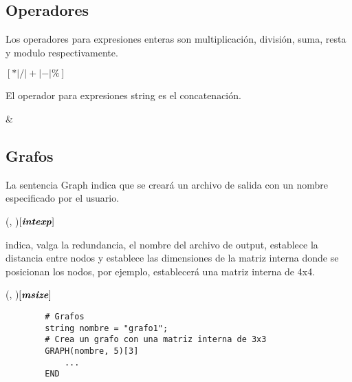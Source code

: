 \documentclass{article}
\begin{document}
    \subsection{Operadores}
    Los operadores para expresiones enteras son multiplicación, división, suma, resta y modulo respectivamente.
    \begin{center}
         $\left[*|/|+|-|\%\right]$ 
    \end{center}
    El operador para expresiones string es el concatenación.
    \begin{center}
         \& 
    \end{center}

    \subsection{Grafos}
    La sentencia Graph indica que se creará un archivo de salida con un nombre especificado por el usuario. 
    \begin{center}
        (, )$\left[\textbf{\textit{intexp}}\right]$
            \begin{center}  \end{center}
        \quad\quad\quad\quad\quad\quad\quad\quad\quad\quad\quad\quad\quad\quad\quad
    \end{center}

     indica, valga la redundancia, el nombre del archivo de output,  establece la distancia entre nodos y
     establece las dimensiones de la matriz interna donde se posicionan los nodos, por ejemplo,  establecerá
    una matriz interna de 4x4. \par
    \begin{center}
        (, )$\left[\textbf{\textit{msize}}\right]$
    \end{center}

    \begin{lstlisting}
        # Grafos
        string nombre = "grafo1";
        # Crea un grafo con una matriz interna de 3x3
        GRAPH(nombre, 5)[3]
            ...
        END 
    \end{lstlisting}
\end{document}
